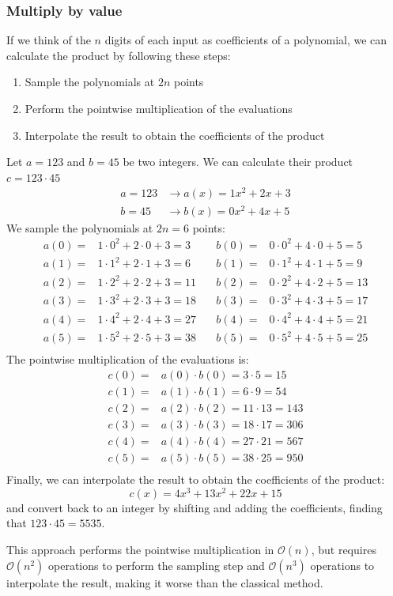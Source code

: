 

\subsubsection{Multiply by value}
If we think of the $n$ digits of each input as coefficients of a polynomial, we can calculate the product by following these steps:
\begin{enumerate}
    \item Sample the polynomials at $2n$ points
    \item Perform the pointwise multiplication of the evaluations
    \item Interpolate the result to obtain the coefficients of the product
\end{enumerate}

\begin{example}
    Let $a=123$ and $b=45$ be two integers. We can calculate their product $c=123\cdot 45$ 
    \begin{align*}
        a = 123 &\longrightarrow a(x) = 1x^2 + 2x + 3 \\
        b =  45 &\longrightarrow b(x) = 0x^2 + 4x + 5
    \end{align*}
    We sample the polynomials at $2n = 6$ points:
    \begin{align*}
        a(0) = &1\cdot 0^2 + 2\cdot 0 + 3 = 3 \quad &b(0) = &0\cdot 0^2 + 4\cdot 0 + 5 = 5 \\
        a(1) = &1\cdot 1^2 + 2\cdot 1 + 3 = 6 \quad &b(1) = &0\cdot 1^2 + 4\cdot 1 + 5 = 9 \\
        a(2) = &1\cdot 2^2 + 2\cdot 2 + 3 = 11 \quad &b(2) = &0\cdot 2^2 + 4\cdot 2 + 5 = 13 \\
        a(3) = &1\cdot 3^2 + 2\cdot 3 + 3 = 18 \quad &b(3) = &0\cdot 3^2 + 4\cdot 3 + 5 = 17 \\
        a(4) = &1\cdot 4^2 + 2\cdot 4 + 3 = 27 \quad &b(4) = &0\cdot 4^2 + 4\cdot 4 + 5 = 21 \\
        a(5) = &1\cdot 5^2 + 2\cdot 5 + 3 = 38 \quad &b(5) = &0\cdot 5^2 + 4\cdot 5 + 5 = 25 \\
    \end{align*}
    The pointwise multiplication of the evaluations is:
    \begin{align*}
        c(0) = &a(0)\cdot b(0) = 3\cdot 5 = 15 \\
        c(1) = &a(1)\cdot b(1) = 6\cdot 9 = 54 \\
        c(2) = &a(2)\cdot b(2) = 11\cdot 13 = 143 \\
        c(3) = &a(3)\cdot b(3) = 18\cdot 17 = 306 \\
        c(4) = &a(4)\cdot b(4) = 27\cdot 21 = 567 \\
        c(5) = &a(5)\cdot b(5) = 38\cdot 25 = 950 \\
    \end{align*}
    Finally, we can interpolate the result to obtain the coefficients of the product:
    \begin{equation*}
        c(x) = 4x^3 + 13x^2 + 22x + 15
    \end{equation*}
    and convert back to an integer by shifting and adding the coefficients, finding that $123\cdot 45 = 5535$.
\end{example}
This approach performs the pointwise multiplication in $\mathcal{O}(n)$, but requires $\mathcal{O}(n^2)$ operations to perform the sampling step
and $\mathcal{O}(n^3)$ operations to interpolate the result, making it worse than the classical method.
